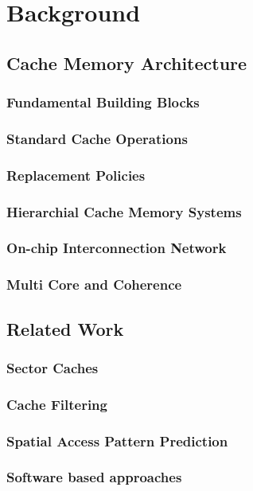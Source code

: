 
%
%

\chapter{Background}
\label{two}

\section{Cache Memory Architecture}
\subsection{Fundamental Building Blocks}
\subsection{Standard Cache Operations}
\subsection{Replacement Policies}
\subsection{Hierarchial Cache Memory Systems}
\subsection{On-chip Interconnection Network}
\subsection{Multi Core and Coherence}

\section{Related Work}
\subsection{Sector Caches}
\subsection{Cache Filtering}
\subsection{Spatial Access Pattern Prediction}
\subsection{Software based approaches}